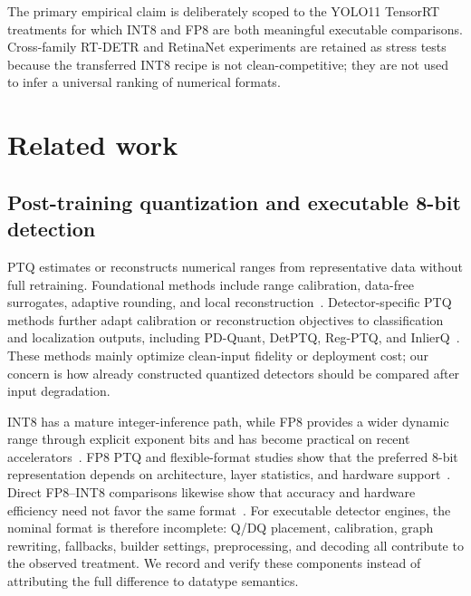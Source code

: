\documentclass[a4paper,fleqn]{cas-dc}
\begin{document}
The primary empirical claim is deliberately scoped to the YOLO11 TensorRT treatments for which INT8 and FP8 are both meaningful executable comparisons. Cross-family RT-DETR and RetinaNet experiments are retained as stress tests because the transferred INT8 recipe is not clean-competitive; they are not used to infer a universal ranking of numerical formats.

\section{Related work}
\label{sec:related-work}

\subsection{Post-training quantization and executable 8-bit detection}

PTQ estimates or reconstructs numerical ranges from representative data without full retraining. Foundational methods include range calibration, data-free surrogates, adaptive rounding, and local reconstruction~\citep{krishnamoorthi2018whitepaper,nagel2019dfq,cai2020zeroq,nagel2020adaround,hubara2021smallcalibration,li2021brecq,wei2022qdrop}. Detector-specific PTQ methods further adapt calibration or reconstruction objectives to classification and localization outputs, including PD-Quant, DetPTQ, Reg-PTQ, and InlierQ~\citep{liu2023pdquant,niu2023detptq,ding2024regptq,kim2026inlierq}. These methods mainly optimize clean-input fidelity or deployment cost; our concern is how already constructed quantized detectors should be compared after input degradation.

INT8 has a mature integer-inference path, while FP8 provides a wider dynamic range through explicit exponent bits and has become practical on recent accelerators~\citep{jacob2018integer,micikevicius2022fp8,noune2022eightbit,kuzmin2022fp8}. FP8 PTQ and flexible-format studies show that the preferred 8-bit representation depends on architecture, layer statistics, and hardware support~\citep{shen2024fp8,zhang2023flexible8bit}. Direct FP8--INT8 comparisons likewise show that accuracy and hardware efficiency need not favor the same format~\citep{vanbaalen2023fp8int8}. For executable detector engines, the nominal format is therefore incomplete: Q/DQ placement, calibration, graph rewriting, fallbacks, builder settings, preprocessing, and decoding all contribute to the observed treatment. We record and verify these components instead of attributing the full difference to datatype semantics.
\end{document}
